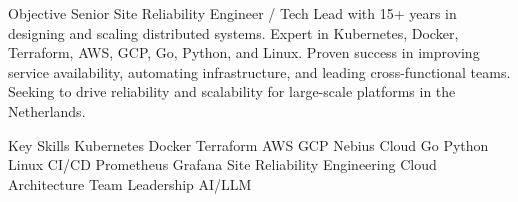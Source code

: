 \documentclass{resume} %
\begin{document}
\begin{rSection}{Objective}
Senior Site Reliability Engineer / Tech Lead with 15+ years in designing and scaling distributed systems. 
Expert in Kubernetes, Docker, Terraform, AWS, GCP, Go, Python, and Linux. 
Proven success in improving service availability, automating infrastructure, and leading cross-functional teams. 
Seeking to drive reliability and scalability for large-scale platforms in the Netherlands.
\end{rSection}

\begin{rSection}{Key Skills}
Kubernetes \textbullet{} Docker \textbullet{} Terraform \textbullet{} AWS \textbullet{} GCP \textbullet{} Nebius Cloud \textbullet{} Go \textbullet{} Python \textbullet{} Linux \textbullet{} CI/CD \textbullet{} Prometheus \textbullet{} Grafana \textbullet{} Site Reliability Engineering \textbullet{} Cloud Architecture \textbullet{} Team Leadership \textbullet{} AI/LLM
\end{rSection}
\end{document}
